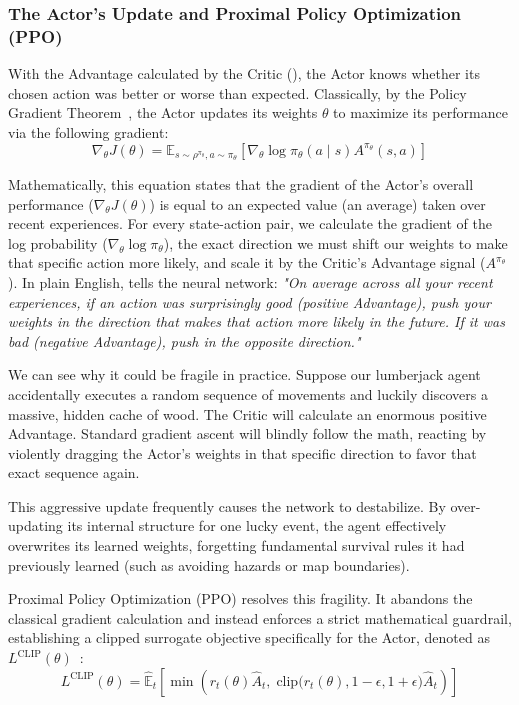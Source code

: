 \subsubsection{The Actor's Update and Proximal Policy Optimization (PPO)}
\label{subsec:ppo}

With the Advantage calculated by the Critic (), the Actor knows whether its chosen action was better or worse than expected. Classically, by the Policy Gradient Theorem~\parencite{Sutton_Barto_2018}, the Actor updates its weights $\theta$ to maximize its performance via the following gradient:
\begin{equation}
    \nabla_\theta J(\theta) = \mathbb{E}_{s \sim \rho^{\pi_\theta}, a \sim \pi_\theta} \left[ \nabla_\theta \log \pi_\theta(a \mid s) A^{\pi_\theta}(s, a) \right]
    \label{eq:policy_gradient}
\end{equation}

Mathematically, this equation states that the gradient of the Actor's overall performance ($\nabla_\theta J(\theta)$) is equal to an expected value (an average) taken over recent experiences. For every state-action pair, we calculate the gradient of the log probability ($\nabla_\theta \log \pi_\theta$), the exact direction we must shift our weights to make that specific action more likely, and scale it by the Critic's Advantage signal ($A^{\pi_\theta}$). In plain English,  tells the neural network: \emph{"On average across all your recent experiences, if an action was surprisingly good (positive Advantage), push your weights in the direction that makes that action more likely in the future. If it was bad (negative Advantage), push in the opposite direction."}

We can see why it could be fragile in practice. Suppose our lumberjack agent accidentally executes a random sequence of movements and luckily discovers a massive, hidden cache of wood. The Critic will calculate an enormous positive Advantage. Standard gradient ascent will blindly follow the math, reacting by violently dragging the Actor's weights in that specific direction to favor that exact sequence again. 

This aggressive update frequently causes the network to destabilize. By over-updating its internal structure for one lucky event, the agent effectively overwrites its learned weights, forgetting fundamental survival rules it had previously learned (such as avoiding hazards or map boundaries).

Proximal Policy Optimization (PPO) resolves this fragility. It abandons the classical gradient calculation and instead enforces a strict mathematical guardrail, establishing a clipped surrogate objective specifically for the Actor, denoted as $L^{\text{CLIP}}(\theta)$~\parencite{Schulman_Wolski_Dhariwal_Radford_Klimov_2017}:
\begin{equation}
\label{eq:ppo_clip}
    L^{\text{CLIP}}(\theta) = \hat{\mathbb{E}}_t \left[ \min\left( r_t(\theta)\hat{A}_t, \; \text{clip}\bigl(r_t(\theta), 1-\epsilon, 1+\epsilon\bigr)\hat{A}_t \right) \right]
\end{equation}

